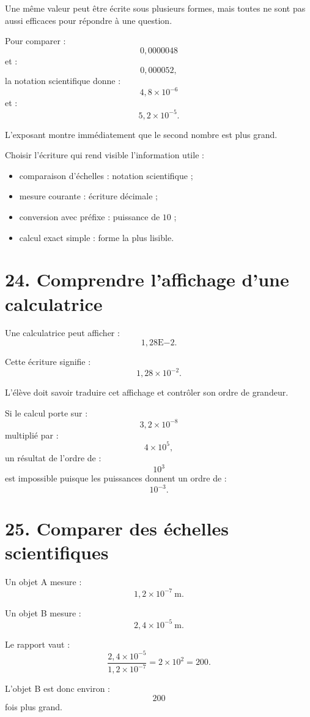 Une même valeur peut être écrite sous plusieurs formes, mais toutes ne sont pas aussi efficaces pour répondre à une question.

Pour comparer :
\[
0{,}0000048
\]
et :
\[
0{,}000052,
\]
la notation scientifique donne :
\[
4{,}8\times10^{-6}
\]
et :
\[
5{,}2\times10^{-5}.
\]

L'exposant montre immédiatement que le second nombre est plus grand.

\begin{methode}
Choisir l'écriture qui rend visible l'information utile :
\begin{itemize}
\item comparaison d'échelles : notation scientifique ;
\item mesure courante : écriture décimale ;
\item conversion avec préfixe : puissance de $10$ ;
\item calcul exact simple : forme la plus lisible.
\end{itemize}
\end{methode}

\section{24. Comprendre l'affichage d'une calculatrice}

Une calculatrice peut afficher :
\[
1{,}28\mathrm{E}{-2}.
\]

Cette écriture signifie :
\[
1{,}28\times10^{-2}.
\]

L'élève doit savoir traduire cet affichage et contrôler son ordre de grandeur.

Si le calcul porte sur :
\[
3{,}2\times10^{-8}
\]
multiplié par :
\[
4\times10^5,
\]
un résultat de l'ordre de :
\[
10^3
\]
est impossible puisque les puissances donnent un ordre de :
\[
10^{-3}.
\]

\section{25. Comparer des échelles scientifiques}

Un objet A mesure :
\[
1{,}2\times10^{-7}\ \text{m}.
\]

Un objet B mesure :
\[
2{,}4\times10^{-5}\ \text{m}.
\]

Le rapport vaut :
\[
\dfrac{2{,}4\times10^{-5}}{1{,}2\times10^{-7}}
=
2\times10^2
=
200.
\]

L'objet B est donc environ :
\[
\boxed{200}
\]
fois plus grand.

